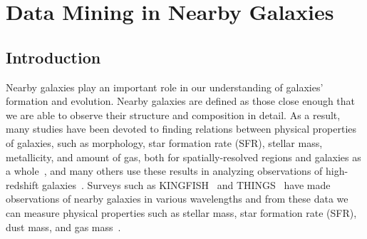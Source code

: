 \chapter{Data Mining in Nearby Galaxies}
\label{ch: paper3}
\section{Introduction} 
Nearby galaxies play an important role in our understanding of galaxies' formation and evolution.
Nearby galaxies are defined as those close enough that we are able to observe their structure and composition in detail.
As a result, many studies have been devoted to finding relations between physical properties of galaxies, such as morphology, star formation rate (SFR), stellar mass, metallicity, and amount of gas, both for spatially-resolved regions and galaxies as a whole~\citep[e.g.][]{Wong13,Leroy08}, and many others use these results in analyzing observations of high-redshift galaxies~\citep[e.g.][]{Freundlich13,Walch11}.
Surveys such as KINGFISH~\citep{Kennicutt11} and THINGS~\citep{Walter08} have made observations of nearby galaxies in various wavelengths and from these data we can measure physical properties such as stellar mass, star formation rate (SFR), dust mass, and gas mass~\citep[e.g.][]{Eskew12,Dale09,Calzetti07}.

